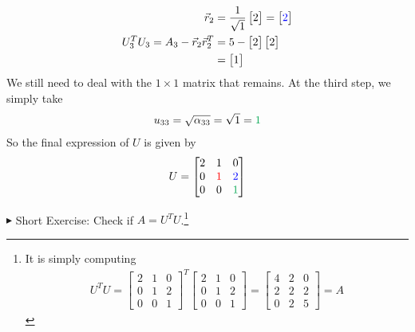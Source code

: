 \begin{solution}
\begin{align*}
\vec{r}_2 &= \frac{1}{\sqrt{1}}
\begin{bmatrix}
2
\end{bmatrix}
=
\begin{bmatrix}
\textcolor{blue}{2}
\end{bmatrix} \\
U_3^T U_3 = A_3  - \vec{r}_2\vec{r}_2^T &=
5 - 
\begin{bmatrix}
2
\end{bmatrix}
\begin{bmatrix}
2
\end{bmatrix} \\
&= 
\begin{bmatrix}
1
\end{bmatrix}
\end{align*}
We still need to deal with the $1 \times 1$ matrix that remains. At the third step, we simply take
\begin{align*}
u_{33} = \sqrt{\alpha_{33}} = \sqrt{1} = \textcolor{Green}{1}
\end{align*}
So the final expression of $U$ is given by
\begin{align*}
U = 
\begin{bmatrix}
2 & 1 & 0 \\
0 & \textcolor{red}{1} & \textcolor{blue}{2} \\
0 & 0 & \textcolor{Green}{1}
\end{bmatrix}
\end{align*}
\end{solution}
$\blacktriangleright$ Short Exercise: Check if $A = U^T U$.\footnote{It is simply computing
\begin{align*}
U^TU = 
\begin{bmatrix}
2 & 1 & 0 \\
0 & 1 & 2 \\
0 & 0 & 1
\end{bmatrix}^T
\begin{bmatrix}
2 & 1 & 0 \\
0 & 1 & 2 \\
0 & 0 & 1
\end{bmatrix} =
\begin{bmatrix}
4 & 2 & 0 \\
2 & 2 & 2 \\
0 & 2 & 5 
\end{bmatrix} = A
\end{align*}
}\par
